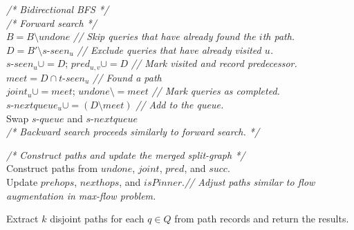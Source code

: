 \begin{algorithm}[t]
{        \textit{\color{blue}/* Bidirectional BFS */} \\
        {
            \textit{\color{gray}/* Forward search */} \\
            {
                $B = B \setminus undone$ \textit{\color{gray}// Skip queries that have already found the $i$th path.} \\
                {
                     $D = B' \setminus s$-$seen_u$ \textit{\color{gray}// Exclude queries that have already visited $u$.} \\
                     $s$-$seen_u \cup= D$; $pred_{u, v} \cup= D$ \textit{\color{gray}// Mark visited and record predecessor.} \\
                     $meet = D \cap t$-$seen_u$ \textit{\color{gray}// Found a path} \\
                     $joint_u \cup= meet$; $undone \setminus= meet$ \textit{\color{gray}// Mark queries as completed.} \\
                     $s$-$nextqueue_u \cup= (D \setminus meet)$ \textit{\color{gray}// Add to the queue.} \\
                }
            }
            Swap $s$-$queue$ and $s$-$nextqueue$ \\
            \textit{\color{gray}/* Backward search proceeds similarly to forward search. */}
        }

        \textit{\color{blue}/* Construct paths and update the merged split-graph */} \\
        Construct paths from $undone$, $joint$, $pred$, and $succ$. \\
        Update $prehops$, $nexthops$, and $isPinner$.\textit{\color{gray}// Adjust paths similar to flow augmentation in max-flow problem. } \\
    }
    
    Extract $k$ disjoint paths for each $q \in Q$ from path records and return the results. \\
\end{algorithm}

